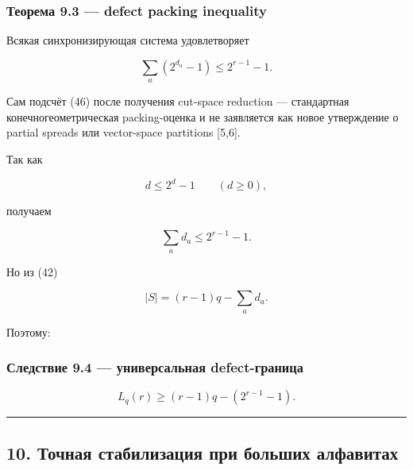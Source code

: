\hypertarget{ux442ux435ux43eux440ux435ux43cux430-9.3-defect-packing-inequality}{%
\subsubsection{Теорема 9.3 --- defect packing
inequality}\label{ux442ux435ux43eux440ux435ux43cux430-9.3-defect-packing-inequality}}

Всякая синхронизирующая система удовлетворяет

\[
\boxed{
\sum_a(2^{d_a}-1)\le2^{r-1}-1.
}
\tag{46}
\]

Сам подсчёт (46) после получения cut-space reduction --- стандартная
конечногеометрическая packing-оценка и не заявляется как новое
утверждение о partial spreads или vector-space partitions {[}5,6{]}.

Так как

\[
d\le2^d-1
\qquad(d\ge0),
\tag{47}
\]

получаем

\[
\sum_a d_a\le2^{r-1}-1.
\tag{48}
\]

Но из (42)

\[
|S|=(r-1)q-\sum_a d_a.
\tag{49}
\]

Поэтому:

\hypertarget{ux441ux43bux435ux434ux441ux442ux432ux438ux435-9.4-ux443ux43dux438ux432ux435ux440ux441ux430ux43bux44cux43dux430ux44f-defect-ux433ux440ux430ux43dux438ux446ux430}{%
\subsubsection{Следствие 9.4 --- универсальная
defect-граница}\label{ux441ux43bux435ux434ux441ux442ux432ux438ux435-9.4-ux443ux43dux438ux432ux435ux440ux441ux430ux43bux44cux43dux430ux44f-defect-ux433ux440ux430ux43dux438ux446ux430}}

\[
\boxed{
L_q(r)\ge(r-1)q-(2^{r-1}-1).
}
\tag{50}
\]

\begin{center}\rule{0.5\linewidth}{0.5pt}\end{center}

\hypertarget{ux442ux43eux447ux43dux430ux44f-ux441ux442ux430ux431ux438ux43bux438ux437ux430ux446ux438ux44f-ux43fux440ux438-ux431ux43eux43bux44cux448ux438ux445-ux430ux43bux444ux430ux432ux438ux442ux430ux445}{%
\subsection{10. Точная стабилизация при больших
алфавитах}\label{ux442ux43eux447ux43dux430ux44f-ux441ux442ux430ux431ux438ux43bux438ux437ux430ux446ux438ux44f-ux43fux440ux438-ux431ux43eux43bux44cux448ux438ux445-ux430ux43bux444ux430ux432ux438ux442ux430ux445}}

